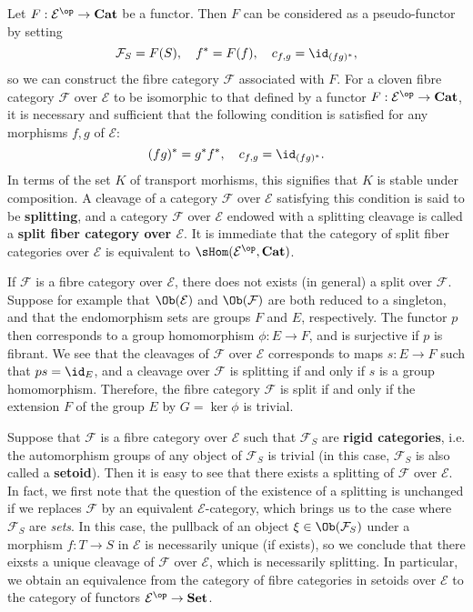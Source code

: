 \begin{example}\label{fibre cat cloven fiven by functor to Cat}
Let $F:\mathcal{E}^{\op}\to \mathbf{Cat}$ be a functor. Then $F$ can be considered as a pseudo-functor by setting
\[\mathcal{F}_S=F(S),\quad f^*=F(f),\quad c_{f,g}=\id_{(fg)^*},\]
so we can construct the fibre category $\mathcal{F}$ associated with $F$. For a cloven fibre category $\mathcal{F}$ over $\mathcal{E}$ to be isomorphic to that defined by a functor $F:\mathcal{E}^{\op}\to \mathbf{Cat}$, it is necessary and sufficient that the following condition is satisfied for any morphisms $f,g$ of $\mathcal{E}$:
\[(fg)^*=g^*f^*,\quad c_{f,g}=\id_{(fg)^*}.\]
In terms of the set $K$ of transport morhisms, this signifies that $K$ is stable under composition. A cleavage of a category $\mathcal{F}$ over $\mathcal{E}$ satisfying this condition is said to be \textbf{splitting}, and a category $\mathcal{F}$ over $\mathcal{E}$ endowed with a splitting cleavage is called a \textbf{split fiber category over $\mathcal{E}$}. It is immediate that the category of split fiber categories over $\mathcal{E}$ is equivalent to $\sHom(\mathcal{E}^{\op},\mathbf{Cat})$.\par
If $\mathcal{F}$ is a fibre category over $\mathcal{E}$, there does not exists (in general) a split over $\mathcal{F}$. Suppose for example that $\Ob(\mathcal{E})$ and $\Ob(\mathcal{F})$ are both reduced to a singleton, and that the endomorphism sets are groups $F$ and $E$, respectively. The functor $p$ then corresponds to a group homomorphism $\phi:E\to F$, and is surjective if $p$ is fibrant. We see that the cleavages of $\mathcal{F}$ over $\mathcal{E}$ corresponds to maps $s:E\to F$ such that $ps=\id_E$, and a cleavage over $\mathcal{F}$ is splitting if and only if $s$ is a group homomorphism. Therefore, the fibre category $\mathcal{F}$ is split if and only if the extension $F$ of the group $E$ by $G=\ker\phi$ is trivial.\par
Suppose that $\mathcal{F}$ is a fibre category over $\mathcal{E}$ such that $\mathcal{F}_S$ are \textbf{rigid categories}, i.e. the automorphism groups of any object of $\mathcal{F}_S$ is trivial (in this case, $\mathcal{F}_S$ is also called a \textbf{setoid}). Then it is easy to see that there exists a splitting of $\mathcal{F}$ over $\mathcal{E}$. In fact, we first note that the question of the existence of a splitting is unchanged if we replaces $\mathcal{F}$ by an equivalent $\mathcal{E}$-category, which brings us to the case where $\mathcal{F}_S$ are \textit{sets}. In this case, the pullback of an object $\xi\in\Ob(\mathcal{F}_S)$ under a morphism $f:T\to S$ in $\mathcal{E}$ is necessarily unique (if exists), so we conclude that there eixsts a unique cleavage of $\mathcal{F}$ over $\mathcal{E}$, which is necessarily splitting. In particular, we obtain an equivalence from the category of fibre categories in setoids over $\mathcal{E}$ to the category of functors $\mathcal{E}^{\op}\to \mathbf{Set}$.
\end{example}
